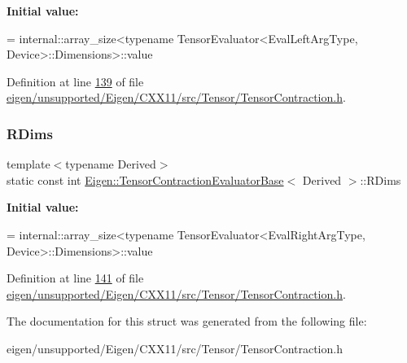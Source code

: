 {\bfseries Initial value\+:}
\begin{DoxyCode}
=
      internal::array\_size<typename TensorEvaluator<EvalLeftArgType, Device>::Dimensions>::value
\end{DoxyCode}


Definition at line \hyperlink{eigen_2unsupported_2_eigen_2_c_x_x11_2src_2_tensor_2_tensor_contraction_8h_source_l00139}{139} of file \hyperlink{eigen_2unsupported_2_eigen_2_c_x_x11_2src_2_tensor_2_tensor_contraction_8h_source}{eigen/unsupported/\+Eigen/\+C\+X\+X11/src/\+Tensor/\+Tensor\+Contraction.\+h}.

\mbox{\label{struct_eigen_1_1_tensor_contraction_evaluator_base_a52d2c4312b5e4a85aeca82caccd3f7e4}} 
\subsubsection{\texorpdfstring{R\+Dims}{RDims}}
{\footnotesize\ttfamily template$<$typename Derived$>$ \\
static const int \hyperlink{struct_eigen_1_1_tensor_contraction_evaluator_base}{Eigen\+::\+Tensor\+Contraction\+Evaluator\+Base}$<$ Derived $>$\+::R\+Dims\hspace{0.3cm}{\ttfamily [static]}}

{\bfseries Initial value\+:}
\begin{DoxyCode}
=
      internal::array\_size<typename TensorEvaluator<EvalRightArgType, Device>::Dimensions>::value
\end{DoxyCode}


Definition at line \hyperlink{eigen_2unsupported_2_eigen_2_c_x_x11_2src_2_tensor_2_tensor_contraction_8h_source_l00141}{141} of file \hyperlink{eigen_2unsupported_2_eigen_2_c_x_x11_2src_2_tensor_2_tensor_contraction_8h_source}{eigen/unsupported/\+Eigen/\+C\+X\+X11/src/\+Tensor/\+Tensor\+Contraction.\+h}.



The documentation for this struct was generated from the following file\+:\begin{DoxyCompactItemize}
\item 
eigen/unsupported/\+Eigen/\+C\+X\+X11/src/\+Tensor/\+Tensor\+Contraction.\+h\end{DoxyCompactItemize}
